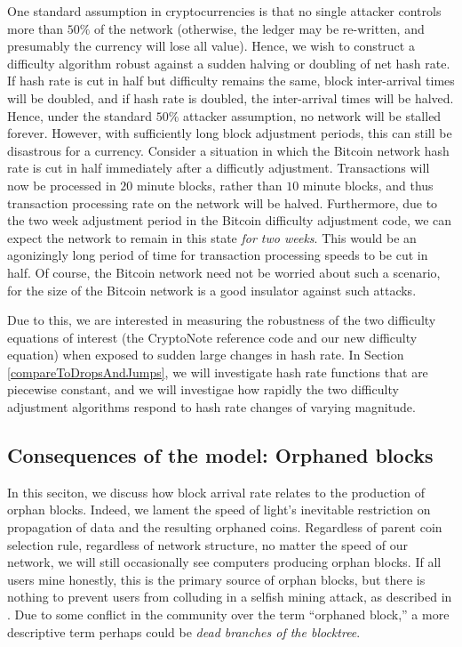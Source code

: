 \documentclass[12pt,english]{mrl}
\theoremstyle{definition}
\numberwithin{equation}{section}
\numberwithin{figure}{section}
\numberwithin{equation}{section}
\numberwithin{equation}{section}
\numberwithin{figure}{section}
\begin{document}
One standard assumption in cryptocurrencies is that no single attacker controls more than $50\%$ of the network (otherwise, the ledger may be re-written, and presumably the currency will lose all value). Hence, we wish to construct a difficulty algorithm robust against a sudden halving or doubling of net hash rate.  If hash rate is cut in half but difficulty remains the same, block inter-arrival times will be doubled, and if hash rate is doubled, the inter-arrival times will be halved. Hence, under the standard $50\%$ attacker assumption, no network will be stalled forever. However, with sufficiently long block adjustment periods, this can still be disastrous for a currency. Consider a situation in which the Bitcoin network hash rate is cut in half immediately after a difficutly adjustment. Transactions will now be processed in $20$ minute blocks, rather than $10$ minute blocks, and thus transaction processing rate on the network will be halved. Furthermore, due to the two week adjustment period in the Bitcoin difficulty adjustment code, we can expect the network to remain in this state \emph{for two weeks}. This would be an agonizingly long period of time for transaction processing speeds to be cut in half. Of course, the Bitcoin network need not be worried about such a scenario, for the size of the Bitcoin network is a good insulator against such attacks.

Due to this, we are interested in measuring the robustness of the two difficulty equations of interest (the CryptoNote reference code and our new difficulty equation) when exposed to sudden large changes in hash rate. In Section \ref{compareToDropsAndJumps}, we will investigate hash rate functions that are piecewise constant, and we will investigae how rapidly the two difficulty adjustment algorithms respond to hash rate changes of varying magnitude.

\subsection{Consequences of the model: Orphaned blocks}\label{orphanedBlocks}
In this seciton,  we discuss how block arrival rate relates to the production of orphan blocks. Indeed, we lament the speed of light's inevitable restriction on propagation of data and the resulting orphaned coins.  Regardless of parent coin selection rule, regardless of network structure, no matter the speed of our network, we will still occasionally see computers producing orphan blocks. If all users mine honestly, this is the primary source of orphan blocks, but there is nothing to prevent users from colluding in a selfish mining attack, as described in \cite{eyal2014majority}. Due to some conflict in the community over the term ``orphaned block,'' a more descriptive term perhaps could be \textit{dead branches of the  blocktree}.
\end{document}
